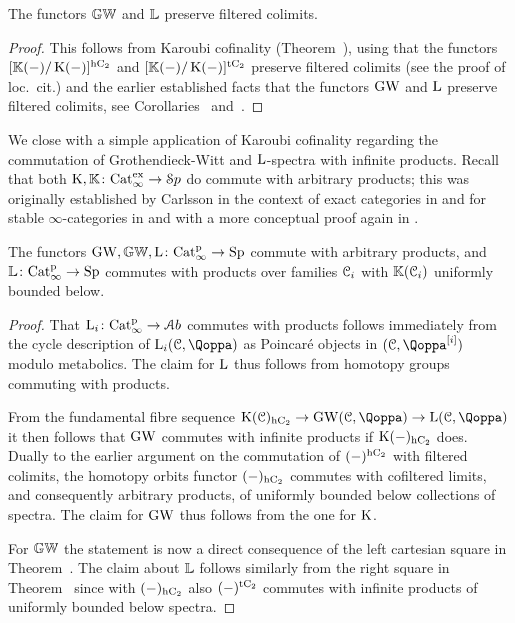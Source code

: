 \begin{corollary}
\label{corollary:filtcolimpreskgwspectrum}%
The functors $\mathbb{GW}$ and $\mathbb{L}$ preserve filtered colimits.
\end{corollary}
\begin{proof}
This follows from Karoubi cofinality (Theorem~), using that the functors $[\mathbb K(-)/\operatorname K(-)]^{{\mathrm{h}\mathrm{C_2}}}$ and $[\mathbb K(-)/\operatorname K(-)]^{{\mathrm{t}\mathrm{C_2}}}$ preserve filtered colimits (see the proof of loc.\ cit.) and the earlier established facts that the functors $\operatorname{GW}$ and $\operatorname L$ preserve filtered colimits, see Corollaries~ and~.
\end{proof}



We close with a simple application of Karoubi cofinality regarding the commutation of Grothendieck-Witt and $\operatorname L$-spectra with infinite products. Recall that both $\operatorname K, \mathbb K \colon \mathrm{Cat}_\infty^{\mathrm{ex}} \rightarrow {\mathcal Sp}$ do commute with arbitrary products; this was originally established by Carlsson in the context of exact categories in \cite{carlsson-infinite} and for stable $\infty$-categories in \cite{kaswing} and with a more conceptual proof again in \cite{Efimov}.

\begin{corollary}
The functors $\operatorname{GW},\mathbb{GW},\operatorname L \colon \mathrm{Cat}^{\mathrm p}_\infty \rightarrow \mathrm{Sp}$ commute with arbitrary products, and $\mathbb{L} \colon \mathrm{Cat}^{\mathrm p}_\infty \rightarrow \mathrm{Sp}$ commutes with products over families $\mathcal C_i$ with $\mathbb K(\mathcal C_i)$ uniformly bounded below.
\end{corollary}


\begin{proof}
That $\operatorname L_i \colon \mathrm{Cat}^{\mathrm p}_\infty \rightarrow \mathcal{A}b$ commutes with products follows immediately from the cycle description of $\L_i(\C,\QF)$ as Poincar\'e objects in $(\C,\QF\qshift{i})$ modulo metabolics. The claim for $\operatorname L$ thus follows from homotopy groups commuting with products. 

From the fundamental fibre sequence $\K(\C)_\hC \rightarrow \GW(\C,\QF) \rightarrow \L(\C,\QF)$ it then follows that $\operatorname{GW}$ commutes with infinite products if $\operatorname K(-)_{\mathrm{h}\mathrm{C_2}}$ does. Dually to the earlier argument on the commutation of $(-)^{{\mathrm{h}\mathrm{C_2}}}$ with filtered colimits, the homotopy orbits functor $(-)_{\mathrm{h}\mathrm{C_2}}$ commutes with cofiltered limits, and consequently arbitrary products, of uniformly bounded below collections of spectra. The claim for $\operatorname{GW}$ thus follows from the one for $\operatorname K$. 

For $\mathbb{GW}$ the statement is now a direct consequence of the left cartesian square in Theorem~. The claim about $\mathbb{L}$ follows similarly from the right square in Theorem~ since with $(-)_{{\mathrm{h}\mathrm{C_2}}}$ also $(-)^{{\mathrm{t}\mathrm{C_2}}}$ commutes with infinite products of uniformly bounded below spectra. 
\end{proof}

